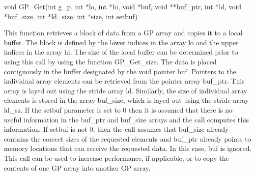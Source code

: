 \documentclass[12pt]{article}
\begin{document}


\begin{capi}
\begin{ccode}
void GP_Get(int g_p, int *lo, int *hi, void *buf, void **buf_ptr, int *ld,
             void *buf_size, int *ld_size, int *size, int setbuf)
\end{ccode}
\begin{funcargs}
\end{funcargs}
\end{capi}

\ncoll

\begin{desc}

This function retrieves a block of data from a GP array and copies it to a local
buffer.  The block is defined by the lower indices in the array lo
and the upper indices in the array hi. The size of the local buffer can be
determined prior to using this call by using the function GP\_Get\_size. The
data is placed contiguously in the buffer designated by the void pointer buf.
Pointers to the individual array elements can be retrieved from the pointer
array buf\_ptr. This array is layed out using the stride array ld. Similarly,
the size of individual array elements is stored in the array buf\_size, which is
layed out using the stride array ld\_sz. If the setbuf parameter is set to 0
then it is assumed that there is no useful information in the buf\_ptr and
buf\_size arrays and the call computes this information. If setbuf is not 0,
then the call assumes that buf\_size already contains the correct sizes of the
requested elements and buf\_ptr already points to memory locations that can
receive the requested data. In this case, buf is ignored. This call can be used
to increase performance, if applicable, or to copy the contents of one GP array
into another GP array.

\end{desc}
\end{document}
